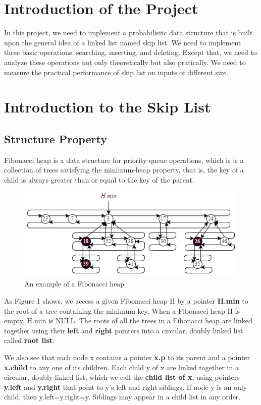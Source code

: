 \documentclass[12pt]{article}
\begin{document}
    \section{Introduction of the Project}
    In this project, we need to implement a probabilisitc data structure that 
    is built upon the general idea of a linked list named skip list.
    We need to implement three basic operations: searching, inserting, 
    and deleting. Except that, we need to analyze these operations not 
    only theoretically but also pratically. We need to measure the practical 
    performance of skip list on inputs of different size.

    \section{Introduction to the Skip List}
    \subsection{Structure Property}
    Fibonacci heap is a data structure for priority queue operations, 
    which is is a collection of trees satisfying the minimum-heap property, that is, the key 
    of a child is always greater than or equal to the key of the parent.
    \begin{figure}[h]
        \centering
        \includegraphics[scale=0.7]{heap.png}
        \caption{An example of a Fibonacci heap}
    \end{figure}

    As Figure 1 shows, we access a given Fibonacci heap H by a pointer \textbf{H.min} to the root of a tree
    containing the minimum key. When a Fibonacci heap H is empty, H.min
    is NULL. The roots of all the trees in a Fibonacci heap are linked together using their
    \textbf{left} and \textbf{right} pointers into a circular, doubly linked list called \textbf{root list}.
    
    We also see that each node x contains a pointer \textbf{x.p} to its parent and
    a pointer \textbf{x.child} to any one of its children. Each child y of x are linked together
    in a circular, doubly linked list, which we call the \textbf{child list of x}, using pointers 
    \textbf{y.left} and \textbf{y.right} that point to y’s left and right siblings. 
    If node y is an only child, then y.left=y.right=y. Siblings may
    appear in a child list in any order.
    
\end{document}
